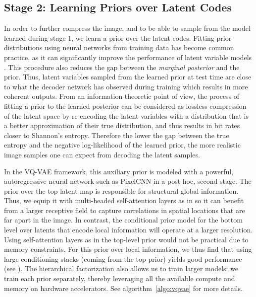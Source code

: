 \subsection{Stage 2: Learning Priors over Latent Codes}
In order to further compress the image, and to be able to sample from the model learned during stage 1, we learn a prior over the latent codes. Fitting prior distributions using neural networks from training data has become common practice, as it can significantly improve the performance of latent variable models \cite{VLAE}. This procedure also reduces the gap between the \textit{marginal posterior} and the prior. Thus, latent variables sampled from the learned prior at test time are close to what the decoder network has observed during training which results in more coherent outputs. From an information theoretic point of view, the process of fitting a prior to the learned posterior can be considered as lossless compression of the latent space by re-encoding the latent variables with a distribution that is a better approximation of their true distribution, and thus results in bit rates closer to Shannon's entropy. Therefore the lower the gap between the true entropy and the negative log-likelihood of the learned prior, the more realistic image samples one can expect from decoding the latent samples. 
\par
In the VQ-VAE framework, this auxiliary prior is modeled with a powerful, autoregressive neural network such as PixelCNN in a post-hoc, second stage. The prior over the top latent map is responsible for structural global information. Thus, we equip it with multi-headed self-attention layers as in \cite{PixelSnail, ImageTransformer} so it can benefit from a larger receptive field to capture correlations in spatial locations that are far apart in the image. In contrast, the conditional prior model for the bottom level over latents that encode local information will operate at a larger resolution. Using self-attention layers as in the top-level prior would not be practical due to memory constraints. For this prior over local information, we thus find that using large conditioning stacks (coming from the top prior) yields good performance (see ). The hierarchical factorization also allows us to train larger models: we train each prior separately, thereby leveraging all the available compute and memory on hardware accelerators. See algorithm~\ref{algo:vqvae} for more details.

